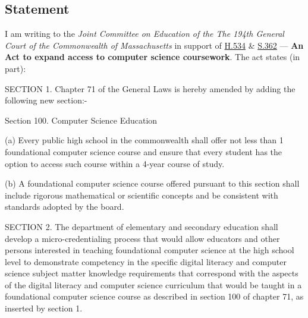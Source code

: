 \documentclass[11pt]{article}%
\begin{document}
\begin{multicols}{2}
\section{Statement}
\label{Statement}

I am writing to the \textit{Joint Committee on Education of the The 194th General Court of the Commonwealth of Massachusetts} in support of \href{https://malegislature.gov/Bills/194/H534}{H.534} \& \href{https://malegislature.gov/Bills/194/S362}{S.362} --- \textbf{An Act to expand access to computer science coursework}. The act states (in part):

\begin{sidebarquote}%

SECTION 1. Chapter 71 of the General Laws is hereby amended by adding the following new section:-

Section 100. Computer Science Education

(a) Every public high school in the commonwealth shall offer not less than 1 foundational computer science course and ensure that every student has the option to access such course within a 4-year course of study.

(b) A foundational computer science course offered pursuant to this section shall include rigorous mathematical or scientific concepts and be consistent with standards adopted by the board.

SECTION 2. The department of elementary and secondary education shall develop a micro-credentialing process that would allow educators and other persons interested in teaching foundational computer science at the high school level to demonstrate competency in the specific digital literacy and computer science subject matter knowledge requirements that correspond with the aspects of the digital literacy and computer science curriculum that would be taught in a foundational computer science course as described in section 100 of chapter 71, as inserted by section 1. %


\end{sidebarquote}
\end{multicols}
\end{document}
